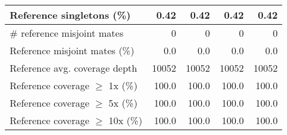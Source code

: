 \documentclass[12pt,a4paper]{article}
\begin{document}
\begin{table}[ht]
\begin{center}
\begin{tabular}{|l*{4}{|r}|}
Reference singletons (\%) & 0.42 & 0.42 & 0.42 & 0.42 \\ \hline
\# reference misjoint mates & 0 & 0 & 0 & 0 \\ \hline
Reference misjoint mates (\%) & 0.0 & 0.0 & 0.0 & 0.0 \\ \hline
Reference avg. coverage depth & 10052 & 10052 & 10052 & 10052 \\ \hline
Reference coverage $\geq$ 1x (\%) & 100.0 & 100.0 & 100.0 & 100.0 \\ \hline
Reference coverage $\geq$ 5x (\%) & 100.0 & 100.0 & 100.0 & 100.0 \\ \hline
Reference coverage $\geq$ 10x (\%) & 100.0 & 100.0 & 100.0 & 100.0 \\ \hline
\end{tabular}
\end{center}
\end{table}
\end{document}
